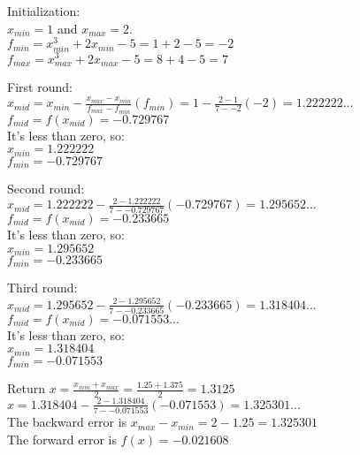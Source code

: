 \documentclass[11pt,letterpaper]{article}
\begin{document}
Initialization:\\
$x_{min} = 1$ and $x_{max} = 2$.\\
$f_{min} = x_{min}^{3} + 2x_{min} - 5 = 1 + 2 - 5 = -2$\\
$f_{max} = x_{max}^{3} + 2x_{max} - 5 = 8 + 4 - 5 = 7$\\

\newcommand{\xmid}[4]{{#1} - \frac{{#2} - {#1}}{{#4} - {#3}}({#3})}

First round:\\
$x_{mid} = \xmid{x_{min}}{x_{max}}{f_{min}}{f_{max}} = \xmid{1}{2}{{-2}}{7} = 1.222222...$\\
$f_{mid} = f(x_{mid}) = -0.729767 $\\
It's less than zero, so:\\
$x_{min} = 1.222222$\\
$f_{min} = -0.729767$

Second round:\\
$x_{mid} = \xmid{1.222222}{2}{{-0.729767}}{7} = 1.295652...$\\
$f_{mid} = f(x_{mid}) = -0.233665 $\\
It's less than zero, so:\\
$x_{min} = 1.295652 $\\
$f_{min} = -0.233665 $

Third round:\\
$x_{mid}  = \xmid{1.295652}{2}{{-0.233665}}{7} = 1.318404...$\\
$f_{mid} = f(x_{mid}) = -0.071553... $\\
It's less than zero, so:\\
$x_{min} = 1.318404$\\
$f_{min} = -0.071553$

Return $x = \frac{x_{min} + x_{max}}{2} = \frac{1.25 + 1.375}{2} = 1.3125$\\
$x = \xmid{1.318404}{2}{{-0.071553}}{7} = 1.325301...$\\
The backward error is $x_{max} - x_{min} = 2 - 1.25 = 1.325301 $\\
The forward error is $f(x) = -0.021608$
\end{document}
